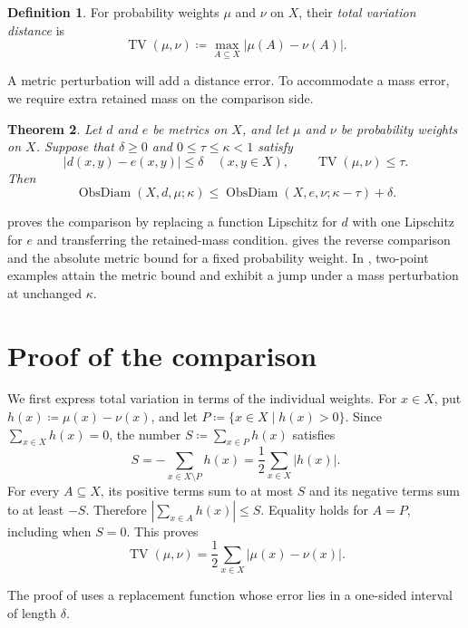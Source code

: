 \documentclass[a4paper,11pt]{article}
\newtheorem{theorem}{Theorem}[section]
\theoremstyle{definition}
\newtheorem{definition}[theorem]{Definition}
\DeclareMathOperator{\ObsDiam}{ObsDiam}
\DeclareMathOperator{\TV}{TV}
\begin{document}
\begin{definition}
For probability weights $\mu$ and $\nu$ on $X$, their \emph{total variation distance} is
\[ \TV(\mu,\nu)\coloneqq\max_{A\subseteq X}|\mu(A)-\nu(A)|. \]
\end{definition}

A metric perturbation will add a distance error. To accommodate a mass error, we require extra retained mass on the comparison side.

\begin{theorem}\label{thm:comparison}
Let $d$ and $e$ be metrics on $X$, and let $\mu$ and $\nu$ be probability weights on $X$. Suppose that $\delta\geq0$ and $0\leq\tau\leq\kappa<1$ satisfy
\[ |d(x,y)-e(x,y)|\leq\delta\quad(x,y\in X),\qquad \TV(\mu,\nu)\leq\tau. \]
Then
\[ \ObsDiam(X,d,\mu;\kappa)\leq\ObsDiam(X,e,\nu;\kappa-\tau)+\delta. \]
\end{theorem}

 proves the comparison by replacing a function Lipschitz for $d$ with one Lipschitz for $e$ and transferring the retained-mass condition.  gives the reverse comparison and the absolute metric bound for a fixed probability weight. In , two-point examples attain the metric bound and exhibit a jump under a mass perturbation at unchanged $\kappa$.

\section{Proof of the comparison}\label{sec:proof}

We first express total variation in terms of the individual weights. For $x\in X$, put $h(x)\coloneqq\mu(x)-\nu(x)$, and let $P\coloneqq\{x\in X\mid h(x)>0\}$. Since $\sum_{x\in X}h(x)=0$, the number $S\coloneqq\sum_{x\in P}h(x)$ satisfies
\[ S=-\sum_{x\in X\setminus P}h(x)=\frac12\sum_{x\in X}|h(x)|. \]
For every $A\subseteq X$, its positive terms sum to at most $S$ and its negative terms sum to at least $-S$. Therefore $|\sum_{x\in A}h(x)|\leq S$. Equality holds for $A=P$, including when $S=0$. This proves
\[ \TV(\mu,\nu)=\frac12\sum_{x\in X}|\mu(x)-\nu(x)|. \]

The proof of  uses a replacement function whose error lies in a one-sided interval of length $\delta$.
\end{document}
